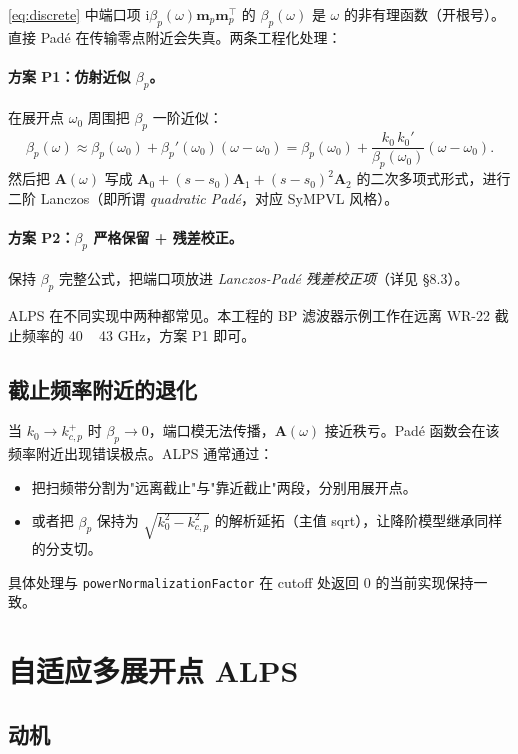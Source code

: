 \documentclass[11pt,a4paper]{ctexart}
\newcommand{\im}{\mathrm{i}}
\begin{document}
\eqref{eq:discrete} 中端口项 $\im\beta_p(\omega)\bm m_p\bm m_p^{\!\top}$ 的 $\beta_p(\omega)$ 是 $\omega$ 的非有理函数（开根号）。直接 Padé 在传输零点附近会失真。两条工程化处理：

\paragraph{方案 P1：仿射近似 $\beta_p$。}
在展开点 $\omega_0$ 周围把 $\beta_p$ 一阶近似：
\begin{equation}
  \beta_p(\omega) \approx \beta_p(\omega_0) + \beta_p'(\omega_0)(\omega-\omega_0)
  = \beta_p(\omega_0) + \frac{k_0\,k_0'}{\beta_p(\omega_0)}(\omega-\omega_0).
\end{equation}
然后把 $\bm A(\omega)$ 写成 $\bm A_0 + (s-s_0)\bm A_1 + (s-s_0)^2\bm A_2$ 的二次多项式形式，进行二阶 Lanczos（即所谓 \emph{quadratic Padé}，对应 SyMPVL 风格）。

\paragraph{方案 P2：$\beta_p$ 严格保留 + 残差校正。}
保持 $\beta_p$ 完整公式，把端口项放进 \emph{Lanczos-Padé 残差校正项}（详见 §8.3）。

ALPS 在不同实现中两种都常见。本工程的 BP 滤波器示例工作在远离 WR-22 截止频率的 40 ~ 43 GHz，方案 P1 即可。

\subsection{截止频率附近的退化}

当 $k_0\to k_{c,p}^{+}$ 时 $\beta_p\to 0$，端口模无法传播，$\bm A(\omega)$ 接近秩亏。Padé 函数会在该频率附近出现错误极点。ALPS 通常通过：
\begin{itemize}
\item 把扫频带分割为"远离截止"与"靠近截止"两段，分别用展开点。
\item 或者把 $\beta_p$ 保持为 $\sqrt{k_0^2-k_{c,p}^2}$ 的解析延拓（主值 sqrt），让降阶模型继承同样的分支切。
\end{itemize}
具体处理与 \texttt{powerNormalizationFactor} 在 cutoff 处返回 0 的当前实现保持一致。

\section{自适应多展开点 ALPS}

\subsection{动机}
\end{document}
